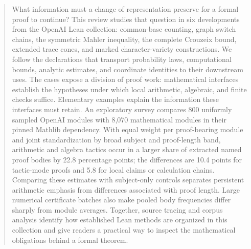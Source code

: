 \begin{abstract}
What information must a change of representation preserve for a formal
proof to continue? This review studies that question in six developments
from the OpenAI Lean collection: common-base counting, graph switch
chains, the symmetric Mahler inequality, the complete Crouzeix bound,
extended trace cones, and marked character-variety constructions.
We follow the declarations that transport probability laws, computational
bounds, analytic estimates, and coordinate identities to their downstream
uses. The cases expose a division of proof work: mathematical interfaces
establish the hypotheses under which local arithmetic, algebraic, and
finite checks suffice. Elementary examples explain the information these
interfaces must retain. An exploratory survey compares 800 uniformly
sampled OpenAI modules with 8,070 mathematical modules in their pinned
Mathlib dependency. With equal weight per proof-bearing module and joint
standardization by broad subject and proof-length band, arithmetic and
algebra tactics occur in a larger share of extracted named proof bodies
by 22.8 percentage points; the differences are 10.4 points for tactic-mode
proofs and 5.8 for local claims or calculation chains. Comparing these
estimates with subject-only controls separates persistent arithmetic
emphasis from differences associated with proof length. Large numerical
certificate batches also make pooled body frequencies differ sharply
from module averages. Together, source tracing and corpus analysis
identify how established Lean methods are organized in this collection
and give readers a practical way to inspect the mathematical obligations
behind a formal theorem.
\end{abstract}
